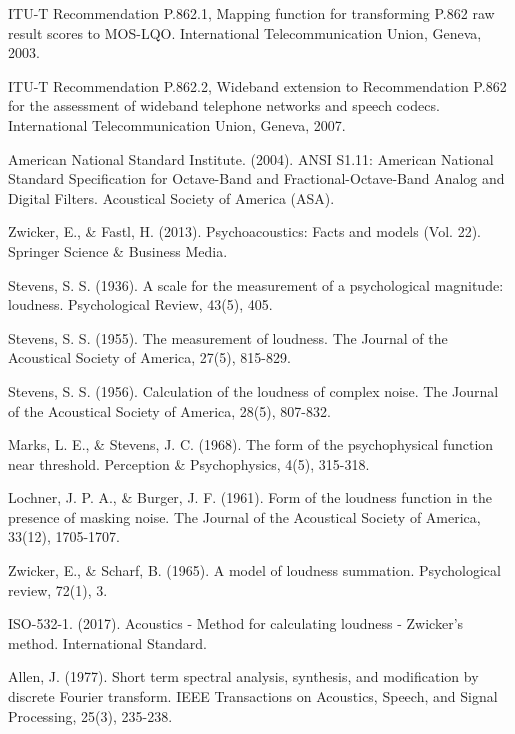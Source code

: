 \documentclass[a4paper, oneside, 13pt]{book}
\begin{document}
\begin{thebibliography}{80}
	ITU-T Recommendation P.862.1, Mapping function for transforming P.862 raw result scores to MOS-LQO. International Telecommunication Union, Geneva, 2003.
	
	ITU-T Recommendation P.862.2, Wideband extension to Recommendation P.862 for the assessment of wideband telephone networks and speech codecs. International Telecommunication Union, Geneva, 2007.
	
	
	American National Standard Institute. (2004). ANSI S1.11: American National Standard Specification for Octave-Band and Fractional-Octave-Band Analog and Digital Filters. Acoustical Society of America (ASA).
	
	
	Zwicker, E., \& Fastl, H. (2013). Psychoacoustics: Facts and models (Vol. 22). Springer Science \& Business Media.
	
	Stevens, S. S. (1936). A scale for the measurement of a psychological magnitude: loudness. Psychological Review, 43(5), 405.
	
	Stevens, S. S. (1955). The measurement of loudness. The Journal of the Acoustical Society of America, 27(5), 815-829.
	
	Stevens, S. S. (1956). Calculation of the loudness of complex noise. The Journal of the Acoustical Society of America, 28(5), 807-832.
	
	Marks, L. E., \& Stevens, J. C. (1968). The form of the psychophysical function near threshold. Perception \& Psychophysics, 4(5), 315-318.
	
	Lochner, J. P. A., \& Burger, J. F. (1961). Form of the loudness function in the presence of masking noise. The Journal of the Acoustical Society of America, 33(12), 1705-1707.
	
	Zwicker, E., \& Scharf, B. (1965). A model of loudness summation. Psychological review, 72(1), 3.
	
	ISO-532-1. (2017). Acoustics - Method for calculating loudness - Zwicker's method. International Standard. 
	
	
	Allen, J. (1977). Short term spectral analysis, synthesis, and modification by discrete Fourier transform. IEEE Transactions on Acoustics, Speech, and Signal Processing, 25(3), 235-238.
	

\end{thebibliography}
\end{document}
